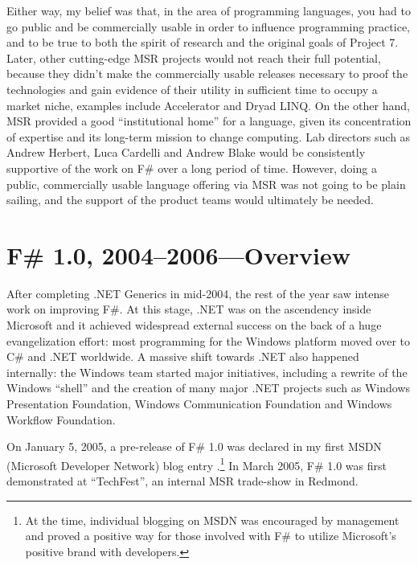 \documentclass[acmsmall,screen]{acmart}
\begin{document}
Either way, my belief was that, in the area of programming languages, you had to go public and be commercially usable in order to influence
programming practice, and to be true to both the spirit of research and the original goals of Project 7. Later, other cutting-edge MSR
projects would not reach their full potential, because they didn’t make the commercially usable releases necessary to proof the technologies
and gain evidence of their utility in sufficient time to occupy a market niche, examples include Accelerator and Dryad LINQ. On the other
hand, MSR provided a good “institutional home” for a language, given its concentration of expertise and its long-term mission to change
computing. Lab directors such as Andrew Herbert, Luca Cardelli and Andrew Blake would be consistently supportive of the work
on F\# over a long period of time. However, doing a public, commercially usable language offering via MSR was not going to be plain
sailing, and the support of the product teams would ultimately be needed.

\section*{F\# 1.0, 2004--2006---Overview}

After completing .NET Generics in mid-2004, the rest of the year saw intense work on improving F\#. At this stage, .NET was on the
ascendency inside Microsoft and it achieved widespread external success on the back of a huge evangelization effort: most programming
for the Windows platform moved over to C\# and .NET worldwide. A massive shift towards .NET also happened internally: the Windows
team started major initiatives, including a rewrite of the Windows “shell” and the creation of many major .NET projects such as Windows
Presentation Foundation, Windows Communication Foundation and Windows Workflow Foundation.

On January 5, 2005, a pre-release of F\# 1.0 was declared in my first MSDN (Microsoft Developer Network) blog
entry \citep{RefBlog1}.\footnote{At the time, individual blogging on MSDN was encouraged by management and proved a positive way for those involved with F\# to utilize Microsoft’s positive brand with developers.}
In March 2005, F\# 1.0 was first demonstrated at “TechFest”, an internal MSR trade-show in Redmond.  
\end{document}

